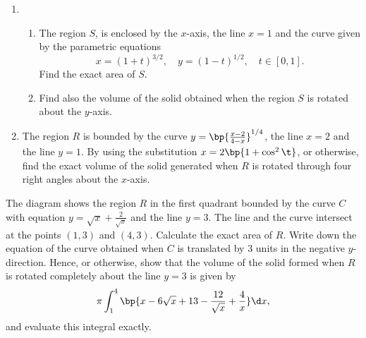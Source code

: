 \begin{problem}
    \begin{enumerate}
        \item \begin{enumerate}
            \item The region $S$, is enclosed by the $x$-axis, the line $x=1$ and the curve given by the parametric equations \[x = (1 + t)^{3/2}, \quad y = (1 - t)^{1/2}, \quad t \in [0, 1].\] Find the exact area of $S$.
            \item Find also the volume of the solid obtained when the region $S$ is rotated about the $y$-axis.
        \end{enumerate}
        \item The region $R$ is bounded by the curve $y=\bp{\frac{x-2}{4-x}}^{1/4}$, the line $x=2$ and the line $y=1$. By using the substitution $x=2\bp{1 + \cos^2 \t}$, or otherwise, find the exact volume of the solid generated when $R$ is rotated through four right angles about the $x$-axis.
    \end{enumerate}
\end{problem}

\begin{problem}
    The diagram shows the region $R$ in the first quadrant bounded by the curve $C$ with equation $y=\sqrt{x}+\frac{2}{\sqrt{x}}$ and the line $y=3$. The line and the curve intersect at the points $(1, 3)$ and $(4, 3)$. Calculate the exact area of $R$. Write down the equation of the curve obtained when $C$ is translated by 3 units in the negative $y$-direction. Hence, or otherwise, show that the volume of the solid formed when $R$ is rotated completely about the line $y=3$ is given by \[\pi \int_1^4 \bp{x - 6\sqrt{x} + 13 - \frac{12}{\sqrt x} + \frac4x} \d x,\] and evaluate this integral exactly.

    \begin{figure}[H]
        \centering
    \end{figure}
\end{problem}

